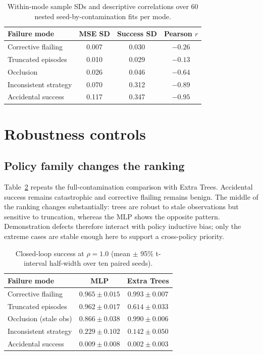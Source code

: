 \documentclass[10pt,twocolumn]{article}
\begin{document}
\begin{table}[t]
\centering
\small
\begin{tabular}{@{}lccc@{}}
\toprule
\textbf{Failure mode} & MSE SD & Success SD & Pearson $r$ \\
\midrule
Corrective flailing   & 0.007 & 0.030 & $-0.26$ \\
Truncated episodes    & 0.010 & 0.029 & $-0.13$ \\
Occlusion             & 0.026 & 0.046 & $-0.64$ \\
Inconsistent strategy & 0.070 & 0.312 & $-0.89$ \\
Accidental success    & 0.117 & 0.347 & $-0.95$ \\
\bottomrule
\end{tabular}
\caption{Within-mode sample SDs and descriptive correlations over 60 nested
seed-by-contamination fits per mode.}
\label{tab:range}
\end{table}

\section{Robustness controls}
\label{sec:controls}

\subsection{Policy family changes the ranking}

Table~\ref{tab:policies} repeats the full-contamination comparison with Extra
Trees. Accidental success remains catastrophic and corrective flailing remains
benign. The middle of the ranking changes substantially: trees are robust to
stale observations but sensitive to truncation, whereas the MLP shows the
opposite pattern. Demonstration defects therefore interact with policy
inductive bias; only the extreme cases are stable enough here to support a
cross-policy priority.

\begin{table}[t]
\centering
\small
\begin{tabular}{@{}lcc@{}}
\toprule
\textbf{Failure mode} & \textbf{MLP} & \textbf{Extra Trees} \\
\midrule
Corrective flailing    & $0.965\pm0.015$ & $0.993\pm0.007$ \\
Truncated episodes     & $0.962\pm0.017$ & $0.614\pm0.033$ \\
Occlusion (stale obs)  & $0.866\pm0.038$ & $0.990\pm0.006$ \\
Inconsistent strategy  & $0.229\pm0.102$ & $0.142\pm0.050$ \\
Accidental success     & $0.009\pm0.008$ & $0.002\pm0.003$ \\
\bottomrule
\end{tabular}
\caption{Closed-loop success at $\rho=1.0$ (mean $\pm$ 95\% t-interval
half-width over ten paired seeds).}
\label{tab:policies}
\end{table}
\end{document}
